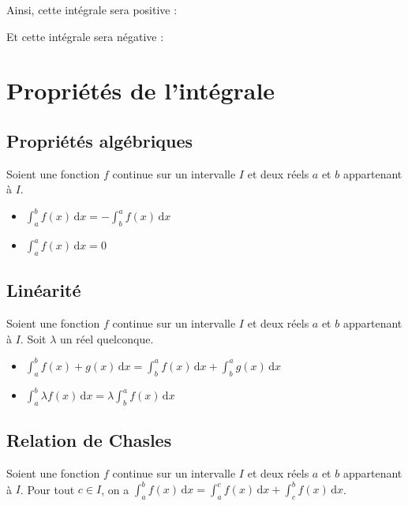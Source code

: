 	Ainsi, cette intégrale sera positive :


	Et cette intégrale sera négative :


	\section{Propriétés de l'intégrale}

	\subsection{Propriétés algébriques}

	\begin{formula}[Propriétés]
		Soient une fonction $f$ continue sur un intervalle $I$ et deux réels $a$ et $b$ appartenant à $I$.
		\begin{itemize}
			\item $\int_{a}^{b} f(x) \, \mathrm{d}x = - \int_{b}^{a} f(x) \, \mathrm{d}x$
			\item $\int_{a}^{a} f(x) \, \mathrm{d}x = 0$
		\end{itemize}
	\end{formula}

	\subsection{Linéarité}

	\begin{formula}
		Soient une fonction $f$ continue sur un intervalle $I$ et deux réels $a$ et $b$ appartenant à $I$. Soit $\lambda$ un réel quelconque.
		\begin{itemize}
			\item $\int_{a}^{b} f(x) + g(x) \, \mathrm{d}x = \int_{b}^{a} f(x) \, \mathrm{d}x + \int_{b}^{a} g(x) \, \mathrm{d}x$
			\item $\int_{a}^{b} \lambda f(x) \, \mathrm{d}x = \lambda \int_{b}^{a} f(x) \, \mathrm{d}x$
		\end{itemize}
	\end{formula}

	\subsection{Relation de Chasles}

	\begin{formula}
		Soient une fonction $f$ continue sur un intervalle $I$ et deux réels $a$ et $b$ appartenant à $I$.
		Pour tout $c \in I$, on a $\int_{a}^{b} f(x) \, \mathrm{d}x = \int_{a}^{c} f(x) \, \mathrm{d}x + \int_{c}^{b} f(x) \, \mathrm{d}x$.
	\end{formula}

